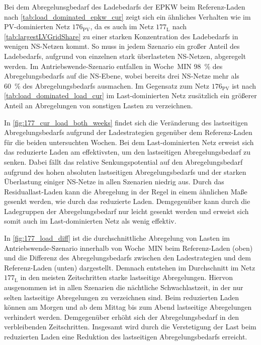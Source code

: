 



Bei dem Abregelunsgbedarf des Ladebedarfs der \gls{EPKW} beim Referenz-Laden nach \autoref{tab:load_dominated_epkw_cur} zeigt sich ein ähnliches Verhalten wie im \gls{PV}-dominierten Netz \(176_{\text{PV}}\), da es auch im Netz \(177_{\text{L}}\) nach \autoref{tab:largestLVGridShare} zu einer starken Konzentration des Ladebedarfs in wenigen \gls{NS}-Netzen kommt.
So muss in jedem Szenario ein großer Anteil des Ladebedarfs, aufgrund von einzelnen stark überlasteten \gls{NS}-Netzen, abgeregelt werden.
Im Antriebswende-Szenario entfallen in Woche~MIN \SI{98}{\percent} des Abregelungsbedarfs auf die \gls{NS}-Ebene, wobei bereits drei \gls{NS}-Netze mehr als \SI{60}{\percent} des Abregelungsbedarfs ausmachen.
Im Gegensatz zum Netz \(176_{\text{PV}}\) ist nach \autoref{tab:load_dominated_load_cur} im Last-dominierten Netz zusätzlich ein größerer Anteil an Abregelungen von sonstigen Lasten zu verzeichnen.





In \autoref{fig:177_cur_load_both_weeks} findet sich die Veränderung des lastseitigen Abregelungsbedarfs aufgrund der Ladestrategien gegenüber dem Referenz-Laden für die beiden untersuchten Wochen.
Bei dem Last-dominierten Netz erweist sich das reduzierte Laden am effektivsten, um den lastseitigen Abregelungsbedarf zu senken.
Dabei fällt das relative Senkungspotential auf den Abregelungsbedarf aufgrund des hohen absoluten lastseitigen Abregelungsbedarfs und der starken Überlastung einiger \gls{NS}-Netze in allen Szenarien niedrig aus.
Durch das Residuallast-Laden kann die Abregelung in der Regel in einem ähnlichen Maße gesenkt werden, wie durch das reduzierte Laden.
Demgegenüber kann durch die Ladegruppen der Abregelungsbedarf nur leicht gesenkt werden und erweist sich somit auch im Last-dominierten Netz als wenig effektiv.



In \autoref{fig:177_load_diff} ist die durchschnittliche Abregelung von Lasten im Antriebswende-Szenario innerhalb von Woche~MIN beim Referenz-Laden (oben) und die Differenz des Abregelungsbedarfs zwischen den Ladestrategien und dem Referenz-Laden (unten) dargestellt.
Demnach entstehen im Durchschnitt im Netz \(177_{\text{L}}\) in den meisten Zeitschritten starke lastseitige Abregelungen.
Hiervon ausgenommen ist in allen Szenarien die nächtliche Schwachlastzeit, in der nur selten lastseitige Abregelungen zu verzeichnen sind.
Beim reduzierten Laden können am Morgen und ab dem Mittag bis zum Abend lastseitige Abregelungen verhindert werden.
Demgegenüber erhöht sich der Abregelungsbedarf in den verbleibenden Zeitschritten.
Insgesamt wird durch die Verstetigung der Last beim reduzierten Laden eine Reduktion des lastseitigen Abregelungsbedarfs erreicht.

